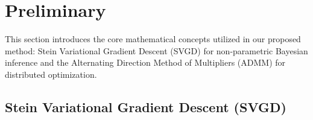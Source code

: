 \section{Preliminary}
\label{sec:preliminary}

This section introduces the core mathematical concepts utilized in our proposed method: Stein Variational Gradient Descent (SVGD) for non-parametric Bayesian inference and the Alternating Direction Method of Multipliers (ADMM) for distributed optimization.

\subsection{Stein Variational Gradient Descent (SVGD)}

